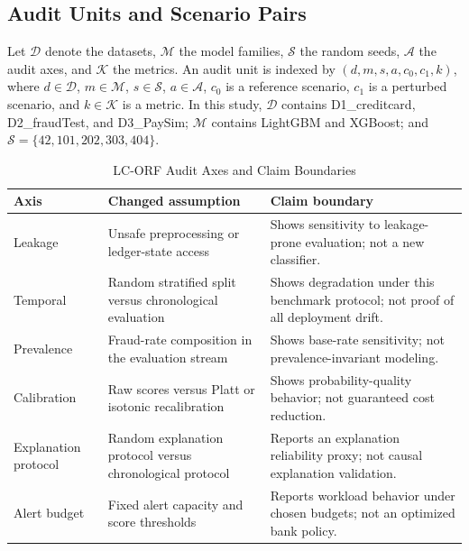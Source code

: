 \documentclass{ieeeaccess}
\begin{document}
\subsection{Audit Units and Scenario Pairs}
Let $\mathcal{D}$ denote the datasets, $\mathcal{M}$ the model families, $\mathcal{S}$ the random seeds, $\mathcal{A}$ the audit axes, and $\mathcal{K}$ the metrics. An audit unit is indexed by $(d,m,s,a,c_0,c_1,k)$, where $d \in \mathcal{D}$, $m \in \mathcal{M}$, $s \in \mathcal{S}$, $a \in \mathcal{A}$, $c_0$ is a reference scenario, $c_1$ is a perturbed scenario, and $k \in \mathcal{K}$ is a metric. In this study, $\mathcal{D}$ contains D1\_creditcard, D2\_fraudTest, and D3\_PaySim; $\mathcal{M}$ contains LightGBM and XGBoost; and $\mathcal{S}=\{42,101,202,303,404\}$.

\begin{table}[!htbp]
\caption{LC-ORF Audit Axes and Claim Boundaries}
\label{tab:audit_axes}
\centering
\scriptsize
\setlength{\tabcolsep}{2pt}
\renewcommand{\arraystretch}{1.08}
\begin{tabularx}{\columnwidth}{|>{\raggedright\arraybackslash}p{}|>{\raggedright\arraybackslash}p{}|>{\raggedright\arraybackslash}X|}
\hline
\textbf{Axis} & \textbf{Changed assumption} & \textbf{Claim boundary}\\
\hline
Leakage & Unsafe preprocessing or ledger-state access & Shows sensitivity to leakage-prone evaluation; not a new classifier.\\
\hline
Temporal & Random stratified split versus chronological evaluation & Shows degradation under this benchmark protocol; not proof of all deployment drift.\\
\hline
Prevalence & Fraud-rate composition in the evaluation stream & Shows base-rate sensitivity; not prevalence-invariant modeling.\\
\hline
Calibration & Raw scores versus Platt or isotonic recalibration & Shows probability-quality behavior; not guaranteed cost reduction.\\
\hline
Explanation protocol & Random explanation protocol versus chronological protocol & Reports an explanation reliability proxy; not causal explanation validation.\\
\hline
Alert budget & Fixed alert capacity and score thresholds & Reports workload behavior under chosen budgets; not an optimized bank policy.\\
\hline
\end{tabularx}
\end{table}
\end{document}

